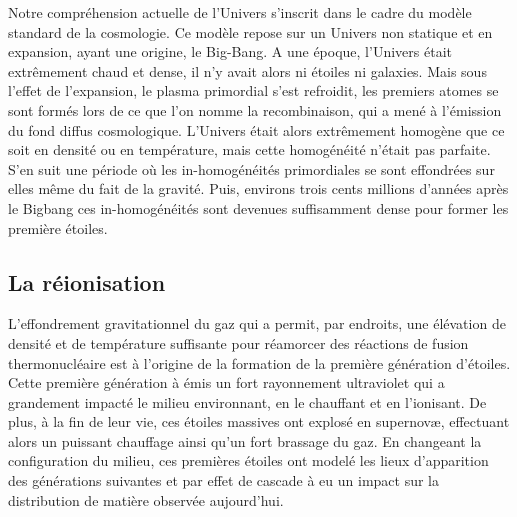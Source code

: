 Notre compréhension actuelle de l'Univers s'inscrit dans le cadre du modèle standard de la cosmologie.
Ce modèle repose sur un Univers non statique et en expansion, ayant une origine, le Big-Bang.
A une époque, l'Univers était extrêmement chaud et dense, il n'y avait alors ni étoiles ni galaxies.
Mais sous l'effet de l'expansion, le plasma primordial s'est refroidit, les premiers atomes se sont formés lors de ce que l'on nomme la recombinaison, qui a mené à l'émission du fond diffus cosmologique.
L'Univers était alors extrêmement homogène que ce soit en densité ou en température, mais cette homogénéité n'était pas parfaite.
S'en suit une période où les in-homogénéités primordiales se sont effondrées sur elles même du fait de la gravité.
Puis, environs trois cents millions d'années après le Bigbang ces in-homogénéités sont devenues suffisamment dense pour former les première étoiles.

\subsection*{La réionisation}
L'effondrement gravitationnel du gaz qui a permit, par endroits, une élévation de densité et de température suffisante pour réamorcer des réactions de fusion thermonucléaire est à l'origine de la formation de la première génération d'étoiles.
Cette première génération à émis un fort rayonnement ultraviolet qui a grandement impacté le milieu environnant, en le chauffant et en l'ionisant. %
De plus, à la fin de leur vie, ces étoiles massives ont explosé en supernovæ, effectuant alors un puissant chauffage ainsi qu'un fort brassage du gaz.
En changeant la configuration du milieu, ces premières étoiles ont modelé les lieux d'apparition des générations suivantes et par effet de cascade à eu un impact sur la distribution de matière observée aujourd'hui.

